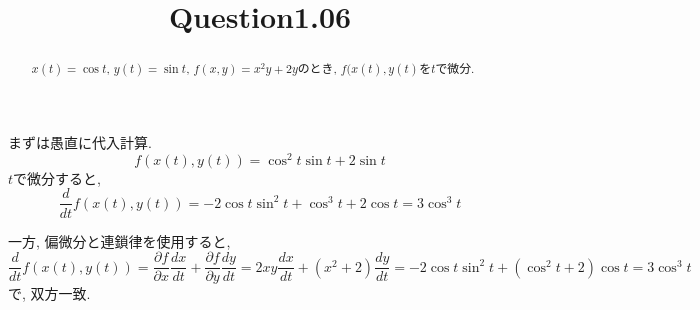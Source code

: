 \documentclass{jsarticle}
\title{Question1.06}
\begin{document}
\maketitle

\begin{abstract}
  $x(t) = \cos{t}$, $y(t) = \sin{t}$, $f(x, y) = x^2y + 2y$のとき, $f(x(t), y(t)$を$t$で微分. 
\end{abstract}
まずは愚直に代入計算. 
\begin{equation}
  f(x(t), y(t)) = \cos^2{t}\sin{t} + 2\sin{t}
\end{equation}
$t$で微分すると, 
\begin{equation}
  \frac{d}{dt}f(x(t), y(t)) = -2\cos{t}\sin^2{t} + \cos^3{t} + 2\cos{t}
  = 3\cos^3{t}
\end{equation}

一方, 偏微分と連鎖律を使用すると, 
\begin{equation}
  \frac{d}{dt}f(x(t), y(t)) = \frac{\partial f}{\partial x} \frac{d x}{d t}
  + \frac{\partial f}{\partial y}\frac{dy}{dt}
  = 2xy \frac{dx}{dt} + (x^2 + 2)\frac{dy}{dt}
  = -2\cos{t}\sin^2{t} + (\cos^2{t} + 2)\cos{t}
  = 3\cos^3{t}
\end{equation}
で, 双方一致. 
\end{document}
